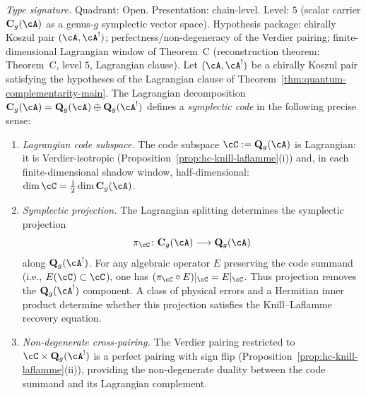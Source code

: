 \begin{theorem}
\label{thm:hc-symplectic-code}
\textit{Type signature.} Quadrant: Open. Presentation: chain-level.
Level: $5$ (scalar carrier $\mathbf{C}_g(\cA)$ as a
genus-$g$ symplectic vector space). Hypothesis package: chirally
Koszul pair $(\cA, \cA^!)$; perfectness/non-degeneracy of the
Verdier pairing; finite-dimensional Lagrangian window of Theorem~C
(reconstruction theorem: Theorem~C, level $5$, Lagrangian clause).
\smallskip\noindent
Let $(\cA, \cA^!)$ be a chirally Koszul pair satisfying the
hypotheses of the Lagrangian clause of
Theorem~\textup{\ref{thm:quantum-complementarity-main}}.
The Lagrangian decomposition
$\mathbf{C}_g(\cA) = \mathbf{Q}_g(\cA) \oplus \mathbf{Q}_g(\cA^!)$
defines a \emph{symplectic code} in the following precise sense:
\begin{enumerate}[label=\textup{(\roman*)}]
\item \emph{Lagrangian code subspace.}
 The code subspace $\cC := \mathbf{Q}_g(\cA)$ is Lagrangian:
 it is Verdier-isotropic
 \textup{(}Proposition~\textup{\ref{prop:hc-knill-laflamme}(i)}\textup{)}
 and, in each finite-dimensional shadow window, half-dimensional:
 $\dim \cC = \tfrac{1}{2}\dim \mathbf{C}_g(\cA)$.

\item \emph{Symplectic projection.}
 The Lagrangian splitting determines
 the symplectic projection
 \[
 \pi_\cC \colon \mathbf{C}_g(\cA) \longrightarrow
 \mathbf{Q}_g(\cA)
 \]
 along $\mathbf{Q}_g(\cA^!)$.  For any algebraic operator $E$
 preserving the code summand \textup{(}i.e.,
 $E(\cC)\subset\cC$\textup{)}, one has
 $(\pi_\cC\circ E)|_\cC=E|_\cC$.  Thus projection removes the
 $\mathbf{Q}_g(\cA^!)$ component.  A class of physical errors and a
 Hermitian inner product determine whether this projection satisfies
 the Knill--Laflamme recovery equation.

\item \emph{Non-degenerate cross-pairing.}
 The Verdier pairing restricted to
 $\cC \times \mathbf{Q}_g(\cA^!)$ is a perfect pairing
 with sign flip
 \textup{(}Proposition~\textup{\ref{prop:hc-knill-laflamme}(ii)}\textup{)},
 providing the non-degenerate duality between
 the code summand and its Lagrangian complement.
\end{enumerate}
\end{theorem}

